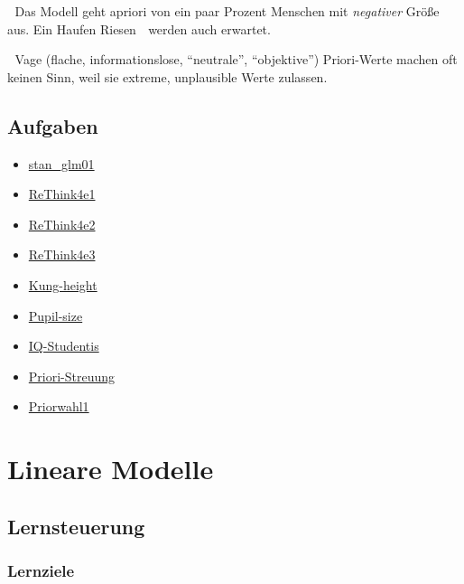 \documentclass[
  a4paper,
  DIV=11]{scrreprt}
\providecommand{\tightlist}{%
  \setlength{\itemsep}{0pt}\setlength{\parskip}{0pt}}\usepackage{longtable,booktabs,array}
\theoremstyle{definition}
\theoremstyle{remark}
\begin{document}
🤔 Das Modell geht apriori von ein paar Prozent Menschen mit
\emph{negativer} Größe aus. Ein Haufen Riesen 👹 werden auch erwartet.

🤯 Vage (flache, informationslose, ``neutrale'', ``objektive'')
Priori-Werte machen oft keinen Sinn, weil sie extreme, unplausible Werte
zulassen.

\hypertarget{aufgaben-6}{%
\section{Aufgaben}\label{aufgaben-6}}

\begin{itemize}
\tightlist
\item
  \href{https://datenwerk.netlify.app/posts/stan_glm01/stan_glm01.html}{stan\_glm01}
\item
  \href{https://datenwerk.netlify.app/posts/rethink4e1/rethink4e1}{ReThink4e1}
\item
  \href{https://datenwerk.netlify.app/posts/rethink4e2/rethink4e2}{ReThink4e2}
\item
  \href{https://datenwerk.netlify.app/posts/rethink4e3/rethink4e3}{ReThink4e3}
\item
  \href{https://datenwerk.netlify.app/posts/kung-height/kung-height}{Kung-height}
\item
  \href{https://datenwerk.netlify.app/posts/pupil-size/pupil-size}{Pupil-size}
\item
  \href{https://datenwerk.netlify.app/posts/iq-studentis/iq-studentis}{IQ-Studentis}
\item
  \href{https://datenwerk.netlify.app/posts/priori-streuung/priori-streuung}{Priori-Streuung}
\item
  \href{https://datenwerk.netlify.app/posts/priorwahl1/priorwahl1}{Priorwahl1}
\end{itemize}


\hypertarget{lineare-modelle}{%
\chapter{Lineare Modelle}\label{lineare-modelle}}

\hypertarget{lernsteuerung-7}{%
\section{Lernsteuerung}\label{lernsteuerung-7}}

\hypertarget{lernziele-8}{%
\subsection{Lernziele}\label{lernziele-8}}
\end{document}
